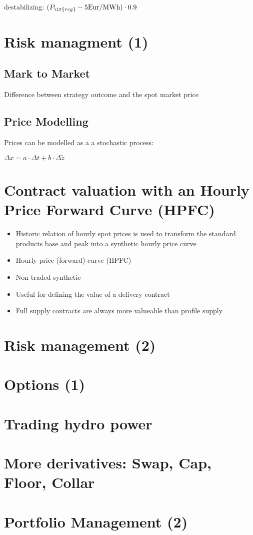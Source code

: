 \documentclass[fs, footer]{latex4ei}
\begin{document}
\begin{multicols*}{4}
destabilizing: $(P_{\ir{reg}} - 5 \text{Eur/MWh}) \cdot 0.9$
\section{Risk managment (1)}

\subsection{Mark to Market} 

Difference between strategy outcome and the spot market price

\subsection{Price Modelling}
Prices can be modelled as a a stochastic process:

$\Delta x = a \cdot \Delta t + b \cdot \Delta \tilde z$

\section{Contract valuation with an Hourly Price Forward Curve (HPFC)}

\begin{itemize}
	\item Historic relation of hourly spot prices is used to transform the standard products base and peak into a synthetic hourly price curve
	\item Hourly price (forward) curve (HPFC)
	\item Non-traded synthetic
	\item Useful for defining the value of a delivery contract
	\item Full supply contracts are always more valueable than profile supply
\end{itemize}

\section{Risk management (2)}

\section{Options (1)}

\section{Trading hydro power}

\section{More derivatives: Swap, Cap, Floor, Collar}

\section{Portfolio Management (2)}             
\end{multicols*}

\end{document}
